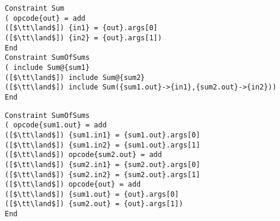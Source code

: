 \begin{lstlisting}[language=CAnDL]
Constraint Sum
( opcode{out} = add
([$\tt\land$]) {in1} = {out}.args[0]
([$\tt\land$]) {in2} = {out}.args[1])
End
Constraint SumOfSums
( include Sum@{sum1}
([$\tt\land$]) include Sum@{sum2}
([$\tt\land$]) include Sum({sum1.out}->{in1},{sum2.out}->{in2}))
End
\end{lstlisting}
\begin{lstlisting}[language=CAnDL,
                   label={fig:inheritsandrenameandrebase},caption=
   {Example for the expansion of {\it include} constraints:
    Both specifications are equivalent.\parfillskip=0pt}]
Constraint SumOfSums
( opcode{sum1.out} = add
([$\tt\land$]) {sum1.in1} = {sum1.out}.args[0]
([$\tt\land$]) {sum1.in2} = {sum1.out}.args[1]
([$\tt\land$]) opcode{sum2.out} = add
([$\tt\land$]) {sum2.in1} = {sum2.out}.args[0]
([$\tt\land$]) {sum2.in2} = {sum2.out}.args[1]
([$\tt\land$]) opcode{out} = add
([$\tt\land$]) {sum1.out} = {out}.args[0]
([$\tt\land$]) {sum2.out} = {out}.args[1])
End
\end{lstlisting}